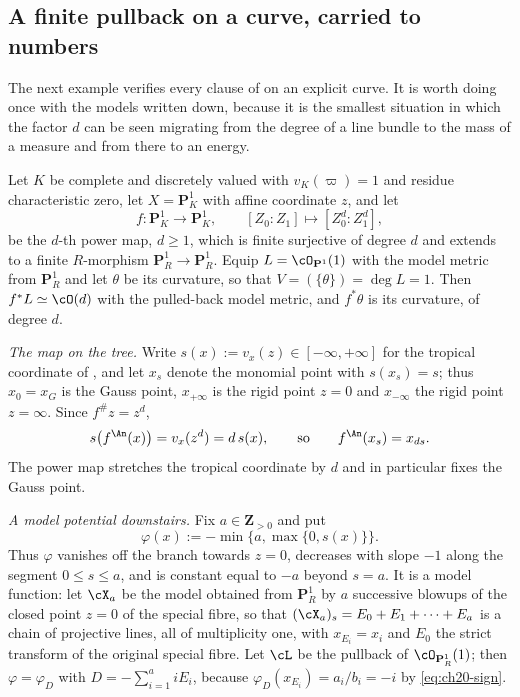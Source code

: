 \subsection{A finite pullback on a curve, carried to numbers}
\label{sec:ch30-finite-example}

The next example verifies every clause of
 on an explicit
curve.  It is worth doing once with the models written down, because it is
the smallest situation in which the factor $d$ can be seen migrating from
the degree of a line bundle to the mass of a measure and from there to an
energy.

\begin{example}
\label{ex:ch30-power-map}
Let $K$ be complete and discretely valued with $v_K(\varpi)=1$ and
residue characteristic zero, let $X=\mathbf P^1_K$ with affine coordinate
$z$, and let
\[
 f:\mathbf P^1_K\longrightarrow\mathbf P^1_K,
 \qquad
 [Z_0:Z_1]\longmapsto[Z_0^d:Z_1^d],
\]
be the $d$-th power map, $d\geq1$, which is finite surjective of degree
$d$ and extends to a finite $R$-morphism
$\mathbf P^1_R\to\mathbf P^1_R$.  Equip $L=\cO_{\mathbf P^1}(1)$ with the
model metric from $\mathbf P^1_{R}$ and let $\theta$ be its curvature,
so that $V=(\{\theta\})=\deg L=1$.  Then $f^*L\simeq\cO(d)$ with the
pulled-back model metric, and $f^*\theta$ is its curvature, of degree
$d$.

\emph{The map on the tree.}  Write $s(x):=v_x(z)\in[-\infty,+\infty]$ for
the tropical coordinate of , and let $x_s$ denote
the monomial point with $s(x_s)=s$; thus $x_0=x_G$ is the Gauss point,
$x_{+\infty}$ is the rigid point $z=0$ and $x_{-\infty}$ the rigid
point $z=\infty$.  Since $f^\#z=z^d$,
\begin{equation}
\label{eq:ch30-power-map-tropical}
 s\bigl(f^{\An}(x)\bigr)=v_x(z^d)=d\,s(x),
 \qquad\text{so}\qquad f^{\An}(x_s)=x_{ds}.
\end{equation}
The power map stretches the tropical coordinate by $d$ and in particular
fixes the Gauss point.

\emph{A model potential downstairs.}  Fix $a\in\mathbf Z_{>0}$ and put
\begin{equation}
\label{eq:ch30-power-map-potential}
 \varphi(x):=-\min\bigl\{a,\max\{0,s(x)\}\bigr\}.
\end{equation}
Thus $\varphi$ vanishes off the branch towards $z=0$, decreases with
slope $-1$ along the segment $0\leq s\leq a$, and is constant equal to
$-a$ beyond $s=a$.  It is a model function: let $\cX_a$ be the model
obtained from $\mathbf P^1_R$ by $a$ successive blowups of the closed
point $z=0$ of the special fibre, so that
$(\cX_a)_s=E_0+E_1+\cdots+E_a$ is a chain of projective lines, all of
multiplicity one, with $x_{E_i}=x_i$ and $E_0$ the strict transform of
the original special fibre.  Let $\cL$ be the pullback of
$\cO_{\mathbf P^1_R}(1)$; then $\varphi=\varphi_D$ with
$D=-\sum_{i=1}^{a}iE_i$, because $\varphi_D(x_{E_i})=a_i/b_i=-i$ by
\eqref{eq:ch20-sign}.


\end{example}
